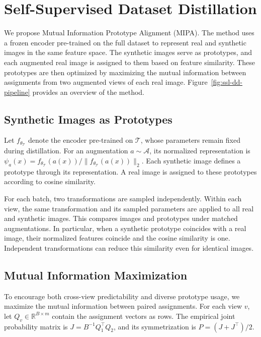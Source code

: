 \section{Self-Supervised Dataset Distillation}
We propose Mutual Information Prototype Alignment (MIPA). The method uses a frozen encoder pre-trained on the full dataset to represent real and synthetic images in the same feature space. The synthetic images serve as prototypes, and each augmented real image is assigned to them based on feature similarity. These prototypes are then optimized by maximizing the mutual information between assignments from two augmented views of each real image. Figure~\ref{fig:ssl-dd-pipeline} provides an overview of the method.

\subsection{Synthetic Images as Prototypes}
Let $f_{\theta_{\mathcal{T}}}$ denote the encoder pre-trained on $\mathcal{T}$, whose parameters remain fixed during distillation. For an augmentation $a\sim\mathcal{A}$, its normalized representation is $\psi_a(x)=f_{\theta_{\mathcal{T}}}(a(x))/\|f_{\theta_{\mathcal{T}}}(a(x))\|_2$. Each synthetic image defines a prototype through its representation. A real image is assigned to these prototypes according to cosine similarity.

For each batch, two transformations are sampled independently. Within each view, the same transformation and its sampled parameters are applied to all real and synthetic images. This compares images and prototypes under matched augmentations. In particular, when a synthetic prototype coincides with a real image, their normalized features coincide and the cosine similarity is one. Independent transformations can reduce this similarity even for identical images.

\subsection{Mutual Information Maximization}
To encourage both cross-view predictability and diverse prototype usage, we maximize the mutual information between paired assignments. For each view $v$, let $Q_v\in\mathbb{R}^{B\times m}$ contain the assignment vectors as rows. The empirical joint probability matrix is $J=B^{-1}Q_1^\top Q_2$, and its symmetrization is $P=(J+J^\top)/2$.

